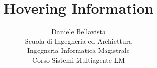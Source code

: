 \documentclass[11pt]{article}
\begin{document}
\title{Hovering Information}
\author{Daniele Bellavista\\
Scuola di Ingegneria ed Archiettura\\
Ingegneria Informatica Magistrale\\
Corso Sistemi Multiagente LM\\
}

\maketitle




\end{document}
